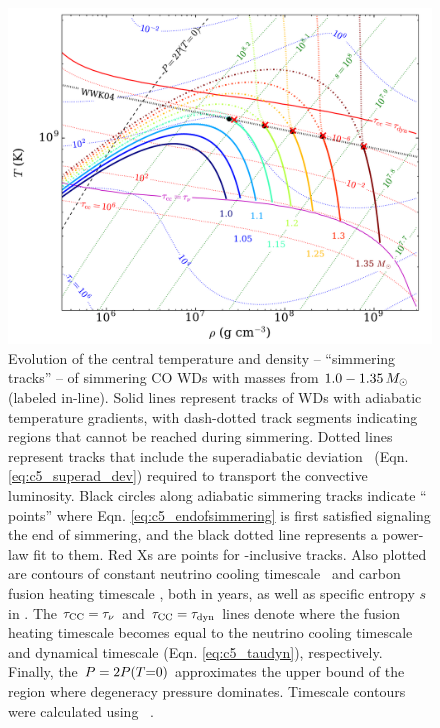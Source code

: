 \begin{figure}
\centering
\includegraphics[angle=0,width=1.0\columnwidth]{chapter5_zhu+16/figures/runaway_rhot.pdf}
\caption{Evolution of the central temperature and density -- ``simmering tracks'' -- of simmering CO WDs with masses from $1.0 - 1.35\,\Msun$ (labeled in-line).  Solid lines represent tracks of WDs with adiabatic temperature gradients, with dash-dotted track segments indicating regions that cannot be reached during simmering.  Dotted lines represent tracks that include the superadiabatic deviation \dnabconv\ (Eqn. \ref{eq:c5_superad_dev}) required to transport the convective luminosity.  Black circles along adiabatic simmering tracks indicate ``\citeal{wooswk04} points'' where Eqn. \ref{eq:c5_endofsimmering} is first satisfied signaling the end of simmering, and the black dotted \citeal{wooswk04} line represents a power-law fit to them.  Red Xs are \citeal{wooswk04} points for \dnabconv-inclusive tracks.  Also plotted are contours of constant neutrino cooling timescale \taunu\ and carbon fusion heating timescale \taucc, both in years, as well as specific entropy $s$ in \ergpKg.  The $\taucc = \taunu$ and $\taucc = \taudyn$ lines denote where the fusion heating timescale becomes equal to the neutrino cooling timescale and dynamical timescale (Eqn. \ref{eq:c5_taudyn}), respectively.  Finally, the $P = 2P(T\mathrm{=}0)$ approximates the upper bound of the region where degeneracy pressure dominates.  Timescale contours were calculated using \mesa\ \citep{paxt+11}.}
\label{fig:c5_runaway_rhot}
\end{figure}

